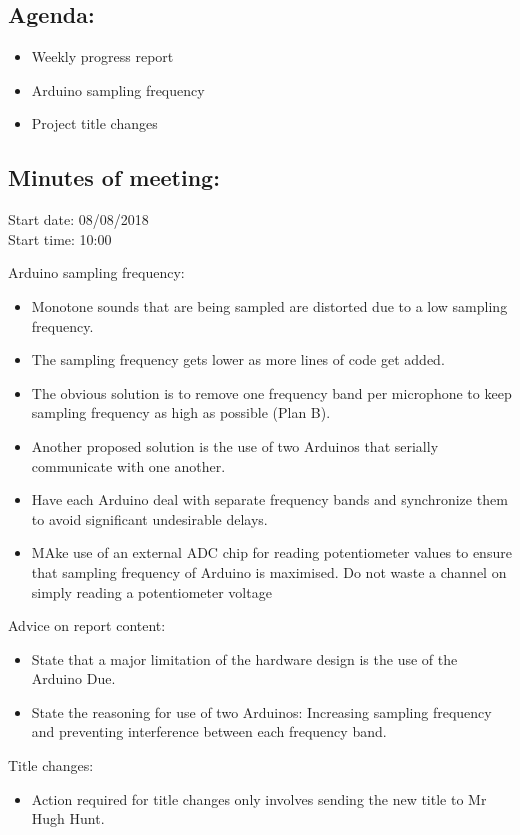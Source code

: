 \documentclass[10pt,onecolumn]{witseiepaper}
\begin{document}
\subsection*{Agenda:} 
\begin{itemize}
	\item Weekly progress report
	\item Arduino sampling frequency
	\item Project title changes
\end{itemize}

\subsection*{Minutes of meeting:}
Start date: 08/08/2018 \\
Start time: 10:00

Arduino sampling frequency:
\begin{itemize}
	\item Monotone sounds that are being sampled are distorted due to a low sampling frequency. 
	\item The sampling frequency gets lower as more lines of code get added.
	\item The obvious solution is to remove one frequency band per microphone to keep sampling frequency as high as possible (Plan B).
	\item Another proposed solution is the use of two Arduinos that serially communicate with one another.
	\item Have each Arduino deal with separate frequency bands and synchronize them to avoid significant undesirable delays.
	\item MAke use of an external ADC chip for reading potentiometer values to ensure that sampling frequency of Arduino is maximised. Do not waste a channel on simply reading a potentiometer voltage
\end{itemize}

Advice on report content:
\begin{itemize}
	\item State that a major limitation of the hardware design is the use of the Arduino Due.
	\item State the reasoning for use of two Arduinos: Increasing sampling frequency and preventing interference between each frequency band.
\end{itemize}

Title changes:
\begin{itemize}
	\item Action required for title changes only involves sending the new title to Mr Hugh Hunt.
\end{itemize}
\end{document}
